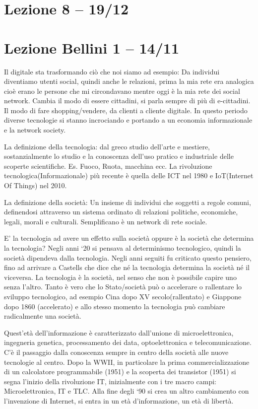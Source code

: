 \documentclass[a4page, 11pt]{article}
\begin{document}
\section*{Lezione 8 -- 19/12}
\section*{Lezione Bellini 1 -- 14/11}

Il digitale sta trasformando ciò che noi siamo ad esempio: Da individui
diventiamo utenti social, quindi anche le relazioni, prima la mia rete
era analogica cioè erano le persone che mi circondavano mentre oggi è la
mia rete dei social network. Cambia il modo di essere cittadini, si
parla sempre di più di e-cittadini. Il modo di fare shopping/vendere, da
clienti a cliente digitale. In questo periodo diverse tecnologie si
stanno incrociando e portando a un economia informazionale e la network
society.

La definizione della tecnologia: dal greco studio dell'arte e mestiere,
sostanzialmente lo studio e la conoscenza dell'uso pratico e industriale
delle scoperte scientifiche. Es. Fuoco, Ruota, macchina ecc. La
rivoluzione tecnologica(Informazionale) più recente è quella delle ICT
nel 1980 e IoT(Internet Of Things) nel 2010.

La definizione della società: Un insieme di individui che soggetti a
regole comuni, definendosi attraverso un sistema ordinato di relazioni
politiche, economiche, legali, morali e culturali. Semplificano è un
network di rete sociale.

E' la tecnologia ad avere un effetto sulla società oppure è la società
che determina la tecnologia? Negli anni `20 si pensava al determinismo
tecnologico, quindi la società dipendeva dalla tecnologia. Negli anni
seguiti fu criticato questo pensiero, fino ad arrivare a Castells che
dice che né la tecnologia determina la società né il viceversa. La
tecnologia è la società, nel senso che non è possibile capire uno senza
l'altro. Tanto è vero che lo Stato/società può o accelerare o rallentare
lo sviluppo tecnologico, ad esempio Cina dopo XV secolo(rallentato) e
Giappone dopo 1860 (accelerato) e allo stesso momento la tecnologia può
cambiare radicalmente una società.

Quest'età dell'informazione è caratterizzato dall'unione di
microelettronica, ingegneria genetica, processamento dei data,
optoelettronica e telecomunicazione. C'è il passaggio dalla conoscenza
sempre in centro della società alle nuove tecnologie al centro. Dopo la
WWII, in particolare la prima commercializzazione di un calcolatore
programmabile (1951) e la scoperta dei transistor (1951) si segna
l'inizio della rivoluzione IT, inizialmente con i tre macro campi:
Microelettronica, IT e TLC. Alla fine degli `90 si crea un altro
cambiamento con l'invenzione di Internet, si entra in un età
d'informazione, un età di libertà.
\end{document}

